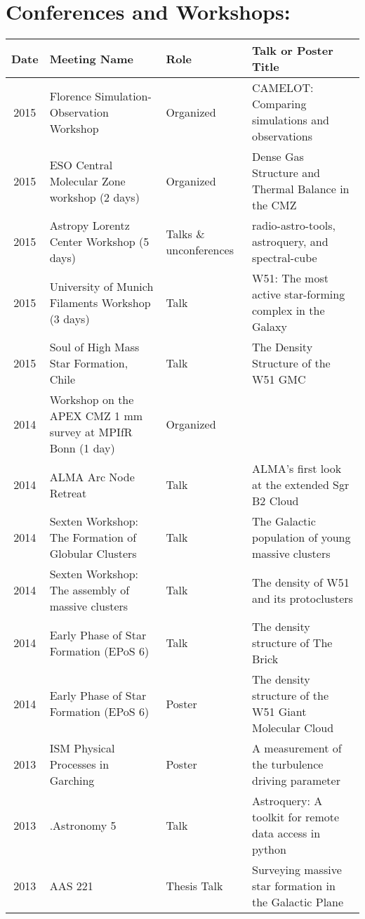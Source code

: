 \documentclass{article}
\begin{document}
\section*{Conferences and Workshops: }
\vspace{-12pt}
\begin{tabular}{cp{1.8in}p{1.5cm}p{3.0in}}
    Date & Meeting Name & Role & Talk or Poster Title \\
                \hline
    2015 &      Florence Simulation-Observation Workshop & Organized & CAMELOT: Comparing simulations and observations \\
    2015 &      ESO Central Molecular Zone workshop (2 days)   & Organized & Dense Gas Structure and Thermal Balance in the CMZ \\
    2015 &      Astropy Lorentz Center Workshop (5 days) & Talks \& unconferences & radio-astro-tools, astroquery, and spectral-cube \\ 
    2015 &      University of Munich Filaments Workshop (3 days) & Talk & W51: The most active star-forming complex in the Galaxy \\
    2015 &      Soul of High Mass Star Formation, Chile & Talk & The Density Structure of the W51 GMC \\
    2014 &      Workshop on the APEX CMZ 1 mm survey at MPIfR Bonn (1 day)   & Organized &  \\
    2014 &      ALMA Arc Node Retreat  & Talk & ALMA's first look at the extended Sgr B2 Cloud \\
    2014 &      Sexten Workshop: The Formation of Globular Clusters  & Talk & The Galactic population of young massive clusters \\
    2014 &      Sexten Workshop: The assembly of massive clusters  & Talk & The density of W51 and its protoclusters \\
    2014 &      Early Phase of Star Formation (EPoS 6)  & Talk & The density structure of The Brick \\
    2014 &      Early Phase of Star Formation (EPoS 6)  & Poster & The density structure of the W51 Giant Molecular Cloud \\
    2013 &      ISM Physical Processes in Garching  & Poster & A measurement of the turbulence driving parameter \\
    2013 &      .Astronomy 5  & Talk & Astroquery: A toolkit for remote data access in python \\
    2013 &      AAS 221  & Thesis Talk & Surveying massive star formation in the Galactic Plane \\

\end{tabular}
\end{document}
